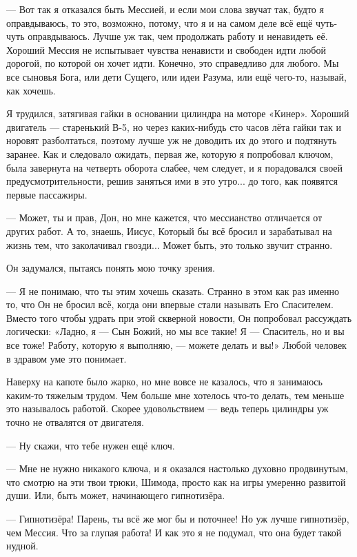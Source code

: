 --- Вот так я отказался быть Мессией, и если мои слова звучат так, будто я оправдываюсь, то это,
возможно, потому, что я и на самом деле всё ещё чуть-чуть оправдываюсь. Лучше уж так, чем
продолжать работу и ненавидеть её. Хороший Мессия не испытывает чувства ненависти и свободен идти
любой дорогой, по которой он хочет идти. Конечно, это справедливо для любого. Мы все сыновья Бога,
или дети Сущего, или идеи Разума, или ещё чего-то, называй, как хочешь.

Я трудился, затягивая гайки в основании цилиндра на моторе «Кинер». Хороший двигатель --- старенький В-5, но через каких-нибудь сто часов лёта гайки так и норовят разболтаться, поэтому лучше уж не доводить их до этого и подтянуть заранее. Как и следовало ожидать, первая же, которую я попробовал ключом, была завернута на четверть оборота слабее, чем следует, и я порадовался своей предусмотрительности, решив заняться ими в это утро... до того, как появятся первые пассажиры.

--- Может, ты и прав, Дон, но мне кажется, что мессианство отличается от других работ. А то,
знаешь, Иисус, Который бы всё бросил и зарабатывал на жизнь тем, что заколачивал гвозди... Может быть, это только звучит странно.

Он задумался, пытаясь понять мою точку зрения.

--- Я не понимаю, что ты этим хочешь сказать. Странно в этом как раз именно то, что Он не бросил
всё, когда они впервые стали называть Его Спасителем. Вместо того чтобы удрать при этой скверной
новости, Он попробовал рассуждать логически: «Ладно, я --- Сын Божий, но мы все такие! Я ---
Спаситель, но и вы все тоже! Работу, которую я выполняю, --- можете делать и вы!» Любой человек в здравом уме это понимает.

Наверху на капоте было жарко, но мне вовсе не казалось, что я занимаюсь каким-то тяжелым трудом. Чем больше мне хотелось что-то делать, тем меньше это называлось работой. Скорее удовольствием --- ведь теперь цилиндры уж точно не отвалятся от двигателя.

--- Ну скажи, что тебе нужен ещё ключ.

--- Мне не нужно никакого ключа, и я оказался настолько духовно продвинутым, что смотрю на эти
твои трюки, Шимода, просто как на игры умеренно развитой души. Или, быть может, начинающего
гипнотизёра.

--- Гипнотизёра! Парень, ты всё же мог бы и поточнее! Но уж лучше гипнотизёр, чем Мессия. Что за глупая работа! И как это я не подумал, что она будет такой нудной.

